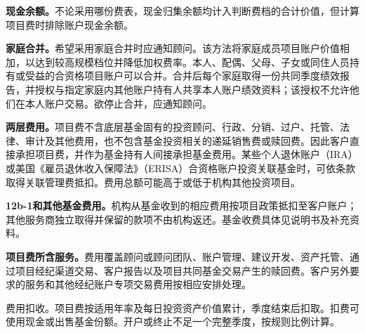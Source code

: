 \documentclass[UTF8,fontset=none,11pt,a4paper]{ctexart}
\begin{document}
\textbf{现金余额。}不论采用哪份费表，现金归集余额均计入判断费档的合计价值，但计算项目费时排除账户\allowbreak\mbox{现金余额。}


\textbf{家庭合并。}希望采用家庭合并时应通知顾问。该方法将家庭成员项目账户价值相加，以达到较高规模档位并降低加权费率。本人、配偶、父母、子女或同住人员持有或受益的合资格项目账户可以合并。合并后每个家庭取得一份共同季度绩效报告，并授权与指定家庭内其他账户持有人共享本人账户绩效资料；该授权不允许他们在本人账户交易。欲停止合并，应\allowbreak\mbox{通知顾问。}


\textbf{两层费用。}项目费不含底层基金固有的投资顾问、行政、分销、过户、托管、法律、审计及其他费用，也不包含基金投资相关的递延销售费或赎回费。因此客户直接承担项目费，并作为基金持有人间接承担基金费用。某些个人退休账户（IRA）或美国《雇员退休收入保障法》（ERISA）合资格账户投资关联基金时，可依条款取得关联管理费抵扣。费用总额可能高于或低于机构其他投\allowbreak\mbox{资项目。}


\textbf{12b-1和其他基金费用。}机构从基金收到的相应费用按项目政策抵扣至客户账户；其他服务商独立取得并保留的款项不由机构返还。基金收费具体见说明书及\allowbreak\mbox{补充资料。}


\textbf{项目费所含服务。}费用覆盖顾问或顾问团队、账户管理、建议开发、资产托管、通过项目经纪渠道交易、客户报告以及项目共同基金交易产生的赎回费。客户另外要求的服务和其他经纪账户专项交易费用按相应\allowbreak\mbox{安排处理。}


费用扣收。项目费按适用年率及每日投资资产价值累计，季度结束后扣取。扣费可使用现金或出售基金份额。开户或终止不足一个完整季度，按规则\allowbreak\mbox{比例计算。}
\end{document}
